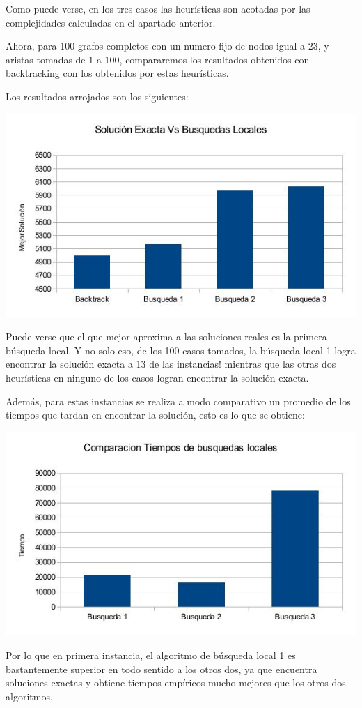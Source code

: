 Como puede verse, en los tres casos las heurísticas son acotadas por las complejidades calculadas en el apartado anterior.

Ahora, para 100 grafos completos con un numero fijo de nodos igual a $23$, y aristas tomadas de $1$ a $100$, compararemos los resultados obtenidos con backtracking con los obtenidos por estas heurísticas.

Los resultados arrojados son los siguientes:

\includegraphics[scale=0.5]{Ej4/solucionestodos.jpg}

Puede verse que el que mejor aproxima a las soluciones reales es la primera búsqueda local. Y no solo eso, de los 100 casos tomados, la búsqueda local 1 logra encontrar la solución exacta a 13 de las instancias! mientras que las otras dos heurísticas en ninguno de los casos logran encontrar la solución exacta.

Además, para estas instancias se realiza a modo comparativo un promedio de los tiempos que tardan en encontrar la solución, esto es lo que se obtiene:

\includegraphics[scale=0.5]{Ej4/tiempotodos.jpg}

Por lo que en primera instancia, el algoritmo de búsqueda local 1 es bastantemente superior en todo sentido a los otros dos, ya que encuentra soluciones exactas y obtiene tiempos empíricos mucho mejores que los otros dos algoritmos.